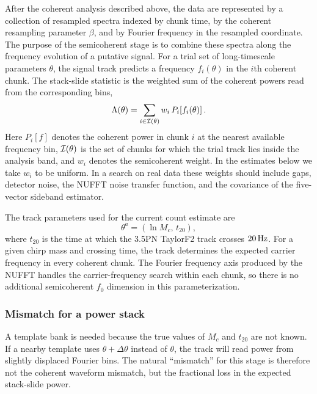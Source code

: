 After the coherent analysis described above, the data are represented by a
collection of resampled spectra indexed by chunk time, by the coherent
resampling parameter $\beta$, and by Fourier frequency in the resampled
coordinate.  The purpose of the semicoherent stage is to combine these spectra
along the frequency evolution of a putative signal.  For a trial set of
long-timescale parameters $\theta$, the signal track predicts a frequency
$f_i(\theta)$ in the $i$th coherent chunk.  The stack-slide statistic is the
weighted sum of the coherent powers read from the corresponding bins,
\begin{equation}
    \Lambda(\theta)
    =
    \sum_{i\in{\cal I}(\theta)}
    w_i\,P_i\!\left[f_i(\theta)\right] .
    \label{eq:stack_slide_statistic}
\end{equation}
Here $P_i[f]$ denotes the coherent power in chunk $i$ at the nearest available
frequency bin, ${\cal I}(\theta)$ is the set of chunks for which the trial
track lies inside the analysis band, and $w_i$ denotes the semicoherent weight.
In the estimates below we take $w_i$ to be uniform.  In a search on real data
these weights should include gaps, detector noise, the NUFFT noise transfer
function, and the covariance of the five-vector sideband estimator.

The track parameters used for the current count estimate are
\begin{equation}
    \theta^a = \left(\ln M_c,\,t_{20}\right),
    \label{eq:track_coordinates}
\end{equation}
where $t_{20}$ is the time at which the 3.5PN TaylorF2 track crosses
$20\,{\rm Hz}$.  For a given chirp mass and crossing time, the track determines
the expected carrier frequency in every coherent chunk.  The Fourier frequency
axis produced by the NUFFT handles the carrier-frequency search within each
chunk, so there is no additional semicoherent $f_0$ dimension in this
parameterization.

\subsubsection{Mismatch for a power stack}
\label{sec:power_stack_mismatch}

A template bank is needed because the true values of $M_c$ and $t_{20}$ are not
known.  If a nearby template uses $\theta+\Delta\theta$ instead of $\theta$,
the track will read power from slightly displaced Fourier bins.  The natural
``mismatch'' for this stage is therefore not the coherent waveform mismatch,
but the fractional loss in the expected stack-slide power.

